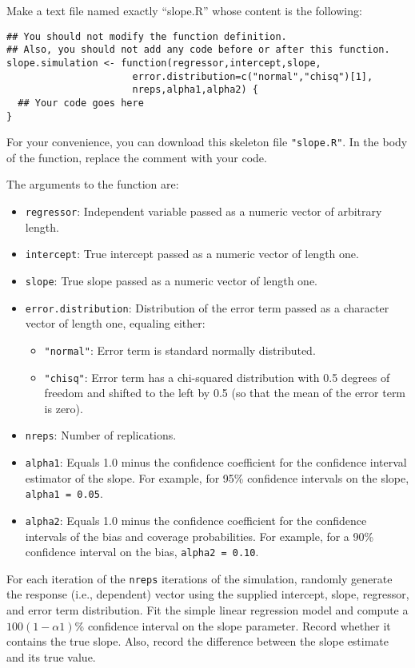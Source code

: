 \documentclass[12pt]{article}
\begin{document}
Make a text file named exactly ``slope.R'' whose content is the following:
\begin{verbatim}## You should not modify the function definition.
## Also, you should not add any code before or after this function.
slope.simulation <- function(regressor,intercept,slope,
                      error.distribution=c("normal","chisq")[1],
                      nreps,alpha1,alpha2) {
  ## Your code goes here
}
\end{verbatim}

For your convenience, you can download this skeleton file \texttt{"slope.R"}. In the body of the function, replace the comment with your code.

The arguments to the function are:
\begin{itemize}
\item \texttt{regressor}: Independent variable passed as a numeric vector of arbitrary length.
\item \texttt{intercept}: True intercept passed as a numeric vector of length one.
\item \texttt{slope}: True slope passed as a numeric vector of length one.
\item \texttt{error.distribution}: Distribution of the error term passed as a character vector of length one, equaling either:
\begin{itemize}
\item \texttt{"normal"}: Error term is standard normally distributed.
\item \texttt{"chisq"}: Error term has a chi-squared distribution with 0.5 degrees of freedom and shifted to the left by 0.5 (so that the mean of the error term is zero).
\end{itemize}
\item \texttt{nreps}: Number of replications.
\item \texttt{alpha1}: Equals 1.0 minus the confidence coefficient for the confidence interval estimator of the slope. For example, for 95\% confidence intervals on the slope, \texttt{alpha1 = 0.05}.
\item \texttt{alpha2}: Equals 1.0 minus the confidence coefficient for the confidence intervals of the bias and coverage probabilities. For example, for a 90\% confidence interval on the bias, \texttt{alpha2 = 0.10}.
\end{itemize}

For each iteration of the \texttt{nreps} iterations of the simulation, randomly generate the response (i.e., dependent) vector using the supplied intercept, slope, regressor, and error term distribution. Fit the simple linear regression model and compute a $100(1-\alpha1)$\% confidence interval on the slope parameter. Record whether it contains the true slope. Also, record the difference between the slope estimate and its true value.
\end{document}

